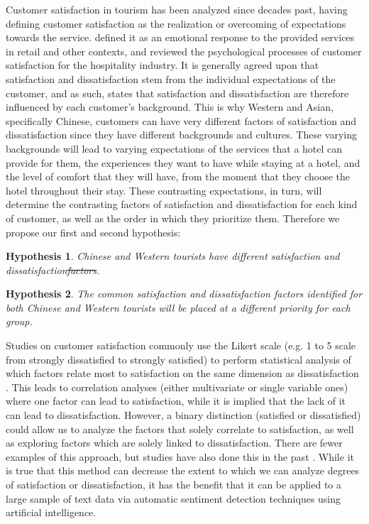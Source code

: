 \documentclass[review]{elsarticle}
\newtheorem{hyp}{Hypothesis}
\providecommand{\DIFadd}[1]{{\protect\color{blue}\uwave{#1}}} %
\providecommand{\DIFdel}[1]{{\protect\color{red}\sout{#1}}}                      %
\providecommand{\DIFaddbegin}{} %
\providecommand{\DIFaddend}{} %
\providecommand{\DIFdelbegin}{} %
\providecommand{\DIFdelend}{} %
\newcommand{\DIFscaledelfig}{0.5}
\newlength{\DIFdelgraphicswidth} %
\newlength{\DIFdelgraphicsheight} %
\newcommand{\DIFaddincludegraphics}[2][]{{\color{blue}\fbox{\DIFOincludegraphics[#1]{#2}}}} %
\newcommand{\DIFdelincludegraphics}[2][]{%
\sbox{\DIFdelgraphicsbox}{\DIFOincludegraphics[#1]{#2}}%
\settoboxwidth{\DIFdelgraphicswidth}{\DIFdelgraphicsbox} %
\settoboxtotalheight{\DIFdelgraphicsheight}{\DIFdelgraphicsbox} %
\scalebox{\DIFscaledelfig}{%
\parbox[b]{\DIFdelgraphicswidth}{\usebox{\DIFdelgraphicsbox}\\[-\baselineskip] \rule{\DIFdelgraphicswidth}{0em}}\llap{\resizebox{\DIFdelgraphicswidth}{\DIFdelgraphicsheight}{%
\setlength{\unitlength}{\DIFdelgraphicswidth}%
\begin{picture}(1,1)%
\thicklines\linethickness{2pt} %
{\color[rgb]{1,0,0}\put(0,0){\framebox(1,1){}}}%
{\color[rgb]{1,0,0}\put(0,0){\line( 1,1){1}}}%
{\color[rgb]{1,0,0}\put(0,1){\line(1,-1){1}}}%
\end{picture}%
}\hspace*{3pt}}} %
} %
\DeclareRobustCommand{\DIFaddbegin}{\DIFOaddbegin \let\includegraphics\DIFaddincludegraphics} %
\DeclareRobustCommand{\DIFaddend}{\DIFOaddend \let\includegraphics\DIFOincludegraphics} %
\DeclareRobustCommand{\DIFdelbegin}{\DIFOdelbegin \let\includegraphics\DIFdelincludegraphics} %
\DeclareRobustCommand{\DIFdelend}{\DIFOaddend \let\includegraphics\DIFOincludegraphics} %
\begin{document}
Customer satisfaction in tourism has been analyzed since decades past, \cite{hunt1975} having defining customer satisfaction as the realization or overcoming of expectations towards the service. \cite{oliver1981} defined it as an emotional response to the provided services in retail and other contexts, and \cite{oh1996} reviewed the psychological processes of customer satisfaction for the hospitality industry. It is generally agreed upon that satisfaction and dissatisfaction stem from the individual expectations of the customer, and as such, \cite{engel1990} states that satisfaction and dissatisfaction are therefore influenced by each customer's background. This is why Western and Asian, specifically Chinese, customers can have very different factors of satisfaction and dissatisfaction since they have different backgrounds and cultures. These varying backgrounds will lead to varying expectations of the services that a hotel can provide for them, the experiences they want to have while staying at a hotel, and the level of comfort that they will have, from the moment that they choose the hotel throughout their stay. These contrasting expectations, in turn, will determine the contrasting factors of satisfaction and dissatisfaction for each kind of customer, as well as the order in which they prioritize them.
Therefore we propose our first and second hypothesis:

\begin{hyp}
\label{hyp:1}
Chinese and Western tourists have different \DIFaddbegin \DIFadd{priorities in hotel attributes that lead to their }\DIFaddend satisfaction and dissatisfaction\DIFdelbegin \DIFdel{factors}\DIFdelend .
\end{hyp}

\begin{hyp}
\label{hyp:2}
The common satisfaction and dissatisfaction factors identified for both Chinese and Western tourists will be placed at a different priority for each group.
\end{hyp}

Studies on customer satisfaction \cite[e.g.][]{truong2009, romao2014, wu2009} commonly use the Likert scale \cite[][]{likert1932technique} (e.g. 1 to 5 scale from strongly dissatisfied to strongly satisfied) to perform statistical analysis of which factors relate most to satisfaction on the same dimension as dissatisfaction \cite[e.g.][]{chan201518, choi2000}. This leads to correlation analyses (either multivariate or single variable ones) where one factor can lead to satisfaction, while it is implied that the lack of it can lead to dissatisfaction. However, a binary distinction (satisfied or dissatisfied) could allow us to analyze the factors that solely correlate to satisfaction, as well as exploring factors which are solely linked to dissatisfaction. There are fewer examples of this approach, but studies have also done this in the past \cite[e.g.][]{zhou2014}. While it is true that this method can decrease the extent to which we can analyze degrees of satisfaction or dissatisfaction, it has the benefit that it can be applied to a large sample of text data via automatic sentiment detection techniques using artificial intelligence. 
\end{document}
